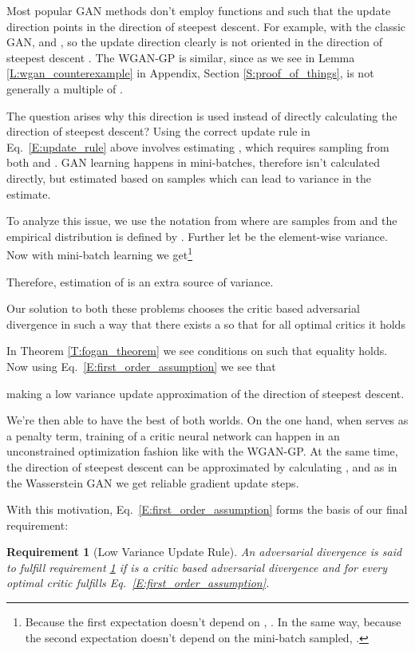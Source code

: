 \documentclass{article}
\newtheorem{requirement}{Requirement}
\begin{document}
 Most popular GAN methods don't employ functions  and  such that the update direction  points in the direction of steepest descent.
 For example, with the classic GAN,  and , so the update direction  clearly is not oriented
 in the direction of steepest descent .
 The WGAN-GP is similar, since as we see in Lemma \ref{L:wgan_counterexample} in Appendix, Section \ref{S:proof_of_things},
  is not generally
 a multiple of .

 The question arises why this direction is used instead of directly calculating the direction of steepest descent?
 Using the correct update rule in Eq.\ \ref{E:update_rule} above involves estimating 
 , which requires sampling from both  and .
 GAN learning happens in mini-batches, therefore  isn't calculated directly, but estimated
 based on samples which can lead to variance in the estimate.

 To analyze this issue, we use the notation from \cite{bellemare2017cramer} where  are samples from  and
 the empirical distribution  is defined by
.
Further let  be the element-wise variance.
Now with mini-batch learning we get\footnote{Because the first expectation doesn't depend on , . In the same way,
 because the second expectation doesn't depend on the mini-batch  sampled,  .}

Therefore, estimation of  is an extra source of variance.

Our solution to both these problems chooses the critic based adversarial divergence 
in such a way that there exists a 
so that for all optimal critics  it holds

In Theorem \ref{T:fogan_theorem} we see conditions on  such that equality holds. Now using Eq.\ \ref{E:first_order_assumption} we see that

making  a low variance update approximation of the direction of steepest descent.

We're then able to have the best of both worlds.
On the one hand, when  serves as a penalty term, training of a critic neural network can happen in
an unconstrained optimization fashion like with the WGAN-GP.
At the same time, the direction of steepest descent can be approximated by calculating ,
and as in the Wasserstein GAN we get reliable gradient update steps.

With this motivation, Eq.\ \ref{E:first_order_assumption} forms the basis of our final requirement:
\begin{requirement}[Low Variance Update Rule]\label{R:fo_divergence}
 An adversarial divergence  is said to fulfill requirement \ref{R:fo_divergence} if
  is a critic based adversarial divergence and
 for every optimal critic  fulfills Eq.\ \ref{E:first_order_assumption}.
 \end{requirement}
 
\end{document}
